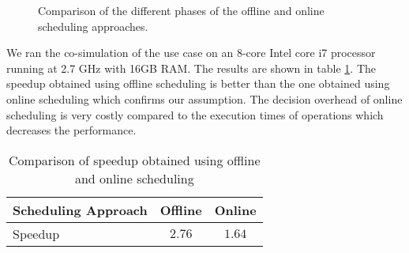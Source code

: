 \begin{figure}[phbt]
\centering

\caption{Comparison of the different phases of the offline and online scheduling approaches.}
\label{fig:tbbvsrcosim}
\end{figure}

We ran the co-simulation of the use case on an 8-core Intel core i7 processor running at 2.7 GHz with 16GB RAM. The results are shown in table \ref{table:spdup_compr}. The speedup obtained using offline scheduling is better than the one obtained using online scheduling which confirms our assumption. The decision overhead of online scheduling is very costly compared to the execution times of operations which decreases the performance. 

\begin{table}[phbt]
\caption{Comparison of speedup obtained using offline and online scheduling}
\centering
\label{table:spdup_compr}
\begin{tabular}{l c c}
\toprule
\parbox[l]{5cm}{\raggedright Scheduling Approach} & Offline & Online \\
\midrule
Speedup & $2.76$ & $1.64$\\
\bottomrule
\end{tabular}
\end{table}



